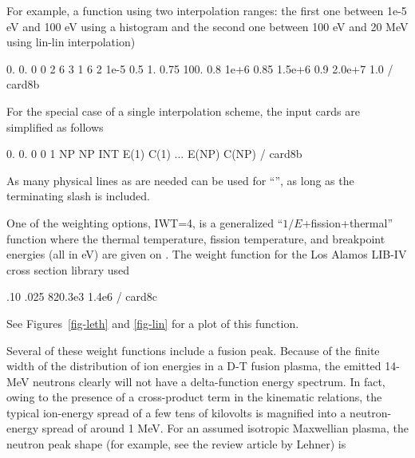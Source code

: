 \noindent
For example, a function using two interpolation ranges: the first one
between 1e-5 eV and 100 eV using a histogram and the second one between
100 eV and 20 MeV using lin-lin interpolation)

\small
\begin{ccode}

   0.      0.      0       0       2       6
   3       1       6       2
   1e-5    0.5     1.      0.75    100.    0.8
   1e+6    0.85    1.5e+6  0.9     2.0e+7  1.0  / card8b

\end{ccode}
\normalsize

\noindent
For the special case of a single interpolation scheme, the input cards
are simplified as follows

\small
\begin{ccode}

   0.      0.      0       0       1       NP
   NP      INT
   E(1)    C(1)      ...   E(NP)   C(NP)        / card8b

\end{ccode}
\normalsize

\noindent
As many physical lines as are needed can be used for ``'',
as long as the terminating slash is included.

One of the weighting options, IWT=4, is a generalized
``$1/E$+fission+thermal'' function where the thermal temperature,
fission temperature, and breakpoint energies (all in eV) are given
on .  The weight function for the Los Alamos LIB-IV
cross section library\cite{LIBIV} used

\small
\begin{ccode}

   .10 .025 820.3e3 1.4e6 / card8c

\end{ccode}
\normalsize

\noindent
See Figures~\ref{fig-leth} and \ref{fig-lin} for a plot of this function.

Several of these weight functions include a fusion peak.
Because of the finite width of the distribution of ion
energies in a D-T fusion plasma, the emitted 14-MeV
neutrons clearly will not have a delta-function energy
spectrum.  In fact, owing to the presence of a cross-product
term in the kinematic relations, the typical ion-energy
spread of a few tens of kilovolts is magnified into a
neutron-energy spread of around 1 MeV.
For an assumed isotropic Maxwellian plasma, the neutron peak
shape (for example, see the review article by Lehner\cite{one}) is

